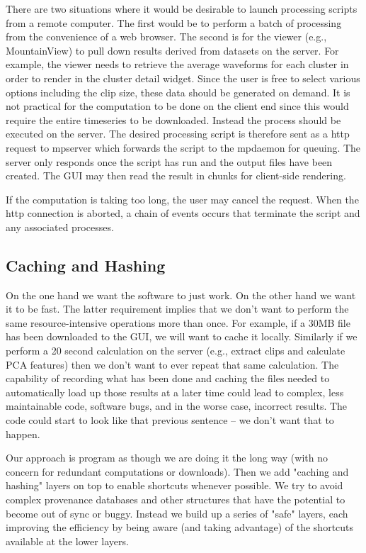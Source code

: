\documentclass{article}
\begin{document}
There are two situations where it would be desirable to launch processing scripts from a remote computer. The first would be to perform a batch of processing from the convenience of a web browser. The second is for the viewer (e.g., MountainView) to pull down results derived from datasets on the server. For example, the viewer needs to retrieve the average waveforms for each cluster in order to render in the cluster detail widget. Since the user is free to select various options including the clip size, these data should be generated on demand. It is not practical for the computation to be done on the client end since this would require the entire timeseries to be downloaded. Instead the process should be executed on the server. The desired processing script is therefore sent as a http request to mpserver which forwards the script to the mpdaemon for queuing. The server only responds once the script has run and the output files have been created. The GUI may then read the result in chunks for client-side rendering.

If the computation is taking too long, the user may cancel the request. When the http connection is aborted, a chain of events occurs that terminate the script and any associated processes.

\subsection{Caching and Hashing}

On the one hand we want the software to just work. On the other hand we want it to be fast. The latter requirement implies that we don't want to perform the same resource-intensive operations more than once. For example, if a 30MB file has been downloaded to the GUI, we will want to cache it locally. Similarly if we perform a 20 second calculation on the server (e.g., extract clips and calculate PCA features) then we don't want to ever repeat that same calculation. The capability of recording what has been done and caching the files needed to automatically load up those results at a later time could lead to complex, less maintainable code, software bugs, and in the worse case, incorrect results. The code could start to look like that previous sentence -- we don't want that to happen.

Our approach is program as though we are doing it the long way (with no concern for redundant computations or downloads). Then we add "caching and hashing" layers on top to enable shortcuts whenever possible. We try to avoid complex provenance databases and other structures that have the potential to become out of sync or buggy. Instead we build up a series of "safe" layers, each improving the efficiency by being aware (and taking advantage) of the shortcuts available at the lower layers.
\end{document}

